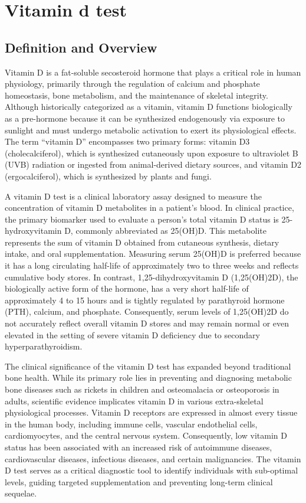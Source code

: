 \chapter{Vitamin d test}

\section*{Definition and Overview}
Vitamin D is a fat-soluble secosteroid hormone that plays a critical role in human physiology, primarily through the regulation of calcium and phosphate homeostasis, bone metabolism, and the maintenance of skeletal integrity. Although historically categorized as a vitamin, vitamin D functions biologically as a pre-hormone because it can be synthesized endogenously via exposure to sunlight and must undergo metabolic activation to exert its physiological effects. The term ``vitamin D'' encompasses two primary forms: vitamin D3 (cholecalciferol), which is synthesized cutaneously upon exposure to ultraviolet B (UVB) radiation or ingested from animal-derived dietary sources, and vitamin D2 (ergocalciferol), which is synthesized by plants and fungi.

A vitamin D test is a clinical laboratory assay designed to measure the concentration of vitamin D metabolites in a patient's blood. In clinical practice, the primary biomarker used to evaluate a person's total vitamin D status is 25-hydroxyvitamin D, commonly abbreviated as 25(OH)D. This metabolite represents the sum of vitamin D obtained from cutaneous synthesis, dietary intake, and oral supplementation. Measuring serum 25(OH)D is preferred because it has a long circulating half-life of approximately two to three weeks and reflects cumulative body stores. In contrast, 1,25-dihydroxyvitamin D (1,25(OH)2D), the biologically active form of the hormone, has a very short half-life of approximately 4 to 15 hours and is tightly regulated by parathyroid hormone (PTH), calcium, and phosphate. Consequently, serum levels of 1,25(OH)2D do not accurately reflect overall vitamin D stores and may remain normal or even elevated in the setting of severe vitamin D deficiency due to secondary hyperparathyroidism.

The clinical significance of the vitamin D test has expanded beyond traditional bone health. While its primary role lies in preventing and diagnosing metabolic bone diseases such as rickets in children and osteomalacia or osteoporosis in adults, scientific evidence implicates vitamin D in various extra-skeletal physiological processes. Vitamin D receptors are expressed in almost every tissue in the human body, including immune cells, vascular endothelial cells, cardiomyocytes, and the central nervous system. Consequently, low vitamin D status has been associated with an increased risk of autoimmune diseases, cardiovascular diseases, infectious diseases, and certain malignancies. The vitamin D test serves as a critical diagnostic tool to identify individuals with sub-optimal levels, guiding targeted supplementation and preventing long-term clinical sequelae.

